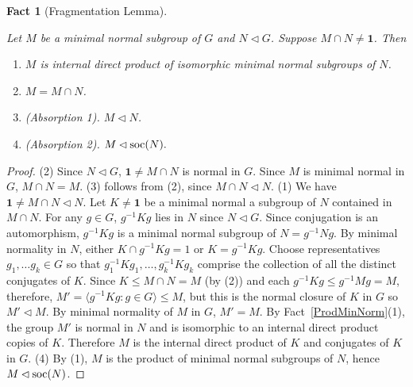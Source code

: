 \documentclass[a4paper,11pt]{amsart}
\newtheorem{fact}[theorem]{Fact}
\theoremstyle{definition}
\newcommand{\soc}{\mbox{\rm soc}}
\newcommand{\1}{{\mathbf 1}}
\begin{document}
 
\begin{fact}[Fragmentation Lemma]\label{fragment}

Let $M$ be a minimal normal subgroup of $G$ and $N \lhd G$. Suppose $M \cap N\neq \1$. Then 
\begin{enumerate} 
\item $M$ is internal direct product of isomorphic minimal normal subgroups of $N$.  \label{frag}
\item  $M=M\cap N$.
\item  (Absorption 1). $M\lhd N$.
\item (Absorption 2).  $M \lhd \mbox{\rm soc}(N).$  
\end{enumerate}
\end{fact}
\begin{proof} (2) Since $N\lhd G$, $\1\neq M\cap N$ is normal in $G$. Since $M$ is minimal normal in $G$, $M\cap N=M$.
(3) follows from (2), since $M\cap N \lhd N$.
(1) We have $\1\neq M\cap N \lhd N$. Let $K\neq \1$ be a minimal normal a subgroup of $N$ contained in $M\cap N$. 
For any $g\in G$,  $g^{-1}Kg$ lies in $N$ since $N \lhd G$. Since conjugation is an automorphism, $g^{-1}Kg$ is a minimal normal subgroup of $N=g^{-1}Ng$.  
By  minimal normality  in $N$, either $K\cap g^{-1}Kg=1$ or $K=g^{-1}Kg$. Choose
representatives
$g_1,\ldots g_k \in G$ so that $g_1^{-1}Kg_1, \ldots, g_k^{-1}Kg_k$ comprise the collection of all the distinct conjugates of $K$. 
Since $K\leq M\cap N= M$ (by (2)) and each $g^{-1}Kg \leq g^{-1}Mg=M$, therefore, $M'=\langle g^{-1} K g : g \in G\rangle \leq M$, but this is the normal closure of $K$ in $G$ so $M'\lhd M$. By  minimal normality  of $M$ in $G$, $M'=M$.
By Fact~\ref{ProdMinNorm}(1),  the group $M'$ is normal in $N$ and is isomorphic to an internal direct product copies of $K$. 
Therefore $M$ is the internal direct product of $K$ and conjugates of $K$ in $G$.
(4) By (1), $M$ is the product of minimal normal subgroups of $N$, hence $M \lhd \soc(N)$.
\end{proof}
\end{document}
